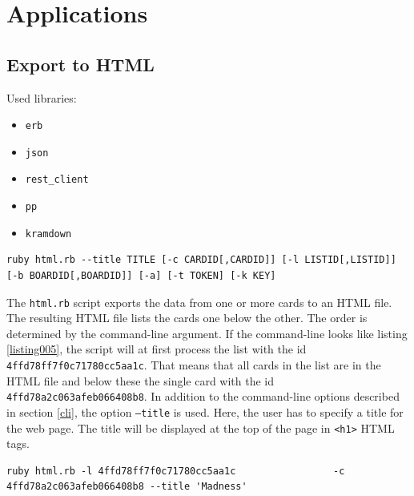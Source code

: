 \onehalfspacing
\chapter{Applications}\label{applications}

\section{Export to HTML}\label{html.rb}

Used libraries:
\begin{itemize}
	\item \texttt{erb}
	\item \texttt{json}
	\item \texttt{rest\_client}
	\item \texttt{pp}
	\item \texttt{kramdown}
\end{itemize}

\begin{lstlisting}[aboveskip=1\baselineskip, style=bash, caption=\texttt{html.rb} usage., label=listing026]
ruby html.rb --title TITLE [-c CARDID[,CARDID]] [-l LISTID[,LISTID]] [-b BOARDID[,BOARDID]] [-a] [-t TOKEN] [-k KEY]
\end{lstlisting}

The \texttt{html.rb} script exports the data from one or more cards to an HTML file. The resulting HTML file lists the cards one below the other. The order is determined by the command-line argument. If the command-line looks like listing \ref{listing005}, the script will at first process the list with the id \texttt{4ffd78ff7f0c71780cc5aa1c}. That means that all cards in the list are in the HTML file and below these the single card with the id \texttt{4ffd78a2c063afeb066408b8}. In addition to the command-line options described in section \ref{cli}, the option \texttt{--title} is used. Here, the user has to specify a title for the web page. The title will be displayed at the top of the page in \lstinline{<h1>} HTML tags.

\begin{lstlisting}[aboveskip=1\baselineskip, style=bash, caption=Example of a \texttt{html.rb} call., label=listing005]
ruby html.rb -l 4ffd78ff7f0c71780cc5aa1c                 -c 4ffd78a2c063afeb066408b8 --title 'Madness'
\end{lstlisting} 

